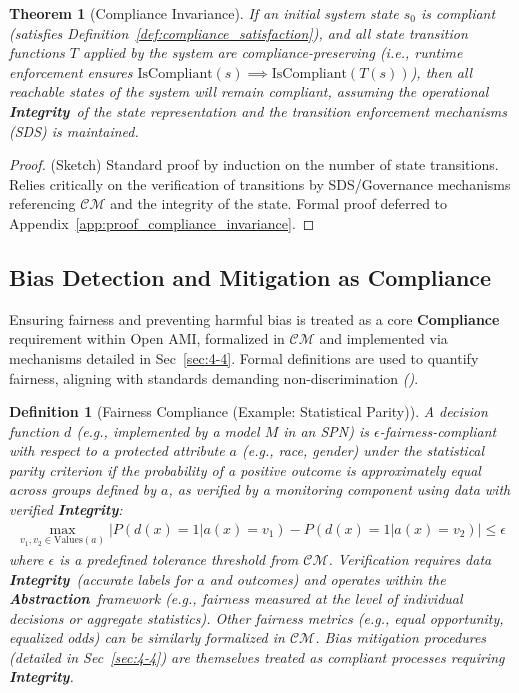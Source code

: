 \documentclass[12pt,a4paper]{report}
\renewcommand{\citep}[1]{\textit{\scriptsize{(\cite{#1})}}}
\newtheorem{definition}{Definition}[section]
\newtheorem{theorem}{Theorem}[section]
\newcommand{\Integrity}{\textbf{Integrity}}
\newcommand{\Abstraction}{\textbf{Abstraction}}
\begin{document}
	\begin{theorem}[Compliance Invariance]
		\label{thm:compliance_invariance}
		If an initial system state $s_0$ is compliant (satisfies Definition~\ref{def:compliance_satisfaction}), and all state transition functions $T$ applied by the system are compliance-preserving (i.e., runtime enforcement ensures $\text{IsCompliant}(s) \implies \text{IsCompliant}(T(s))$), then all reachable states of the system will remain compliant, assuming the operational \Integrity\ of the state representation and the transition enforcement mechanisms (SDS) is maintained.
	\end{theorem}
	\begin{proof}
		(Sketch) Standard proof by induction on the number of state transitions. Relies critically on the verification of transitions by SDS/Governance mechanisms referencing $\mathcal{CM}$ and the integrity of the state. Formal proof deferred to Appendix~\ref{app:proof_compliance_invariance}.
	\end{proof}
	
	\subsection{Bias Detection and Mitigation as Compliance}
	\label{sec:2-9-2}
	
	Ensuring fairness and preventing harmful bias is treated as a core \textbf{Compliance} requirement within Open AMI, formalized in $\mathcal{CM}$ and implemented via mechanisms detailed in Sec~\ref{sec:4-4}. Formal definitions are used to quantify fairness, aligning with standards demanding non-discrimination \citep{Navigating_AI_Conformity_2025}.
	
	\begin{definition}[Fairness Compliance (Example: Statistical Parity)]
		\label{def:fairness_compliance}
		A decision function $d$ (e.g., implemented by a model $M$ in an SPN) is $\epsilon$-fairness-compliant with respect to a protected attribute $a$ (e.g., race, gender) under the statistical parity criterion if the probability of a positive outcome is approximately equal across groups defined by $a$, as verified by a monitoring component using data with verified \Integrity:
		\begin{align}
			\max_{v_1, v_2 \in \text{Values}(a)} \left| P(d(x) = 1 | a(x) = v_1) - P(d(x) = 1 | a(x) = v_2) \right| \leq \epsilon
		\end{align}
		where $\epsilon$ is a predefined tolerance threshold from $\mathcal{CM}$. Verification requires data \Integrity\ (accurate labels for $a$ and outcomes) and operates within the \Abstraction\ framework (e.g., fairness measured at the level of individual decisions or aggregate statistics). Other fairness metrics (e.g., equal opportunity, equalized odds) can be similarly formalized in $\mathcal{CM}$. Bias mitigation procedures (detailed in Sec~\ref{sec:4-4}) are themselves treated as compliant processes requiring \Integrity.
	\end{definition}
	
\end{document}
